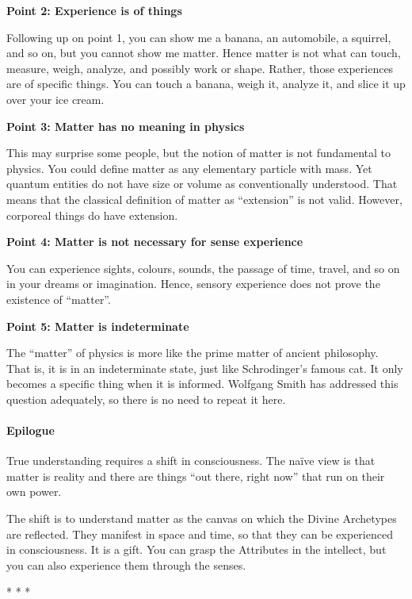 \textbf{Point 2: Experience is of things}


Following up on point 1, you can show me a banana, an automobile, a squirrel, and so on, but you cannot show me matter. Hence matter is not what can touch, measure, weigh, analyze, and possibly work or shape. Rather, those experiences are of specific things. You can touch a banana, weigh it, analyze it, and slice it up over your ice cream.

\textbf{Point 3: Matter has no meaning in physics}


This may surprise some people, but the notion of matter is not fundamental to physics. You could define matter as any elementary particle with mass. Yet quantum entities do not have size or volume as conventionally understood. That means that the classical definition of matter as ``extension'' is not valid. However, corporeal things do have extension.

\textbf{Point 4: Matter is not necessary for sense experience}


You can experience sights, colours, sounds, the passage of time, travel, and so on in your dreams or imagination. Hence, sensory experience does not prove the existence of ``matter''.

\textbf{Point 5: Matter is indeterminate}


The ``matter'' of physics is more like the prime matter of ancient philosophy. That is, it is in an indeterminate state, just like Schrodinger's famous cat. It only becomes a specific thing when it is informed. Wolfgang Smith has addressed this question adequately, so there is no need to repeat it here.

\paragraph{Epilogue}


True understanding requires a shift in consciousness. The naïve view is that matter is reality and there are things ``out there, right now'' that run on their own power.

The shift is to understand matter as the canvas on which the Divine Archetypes are reflected. They manifest in space and time, so that they can be experienced in consciousness. It is a gift. You can grasp the Attributes in the intellect, but you can also experience them through the senses.



\begin{center}* * *\end{center}

